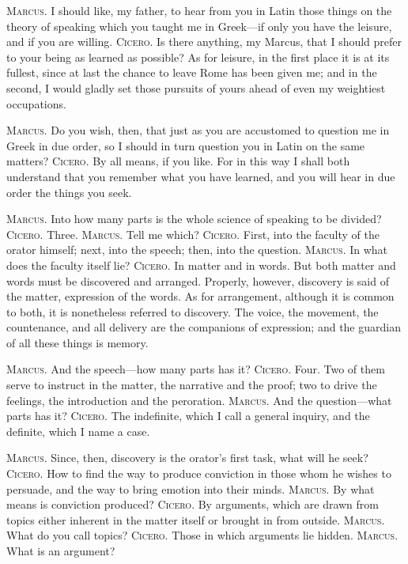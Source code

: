 
 \textsc{Marcus.} I should like, my father, to hear from you in Latin those things on the theory of speaking which you taught me in Greek—if only you have the leisure, and if you are willing. \textsc{Cicero.} Is there anything, my Marcus, that I should prefer to your being as learned as possible? As for leisure, in the first place it is at its fullest, since at last the chance to leave Rome has been given me; and in the second, I would gladly set those pursuits of yours ahead of even my weightiest occupations.

 \textsc{Marcus.} Do you wish, then, that just as you are accustomed to question me in Greek in due order, so I should in turn question you in Latin on the same matters? \textsc{Cicero.} By all means, if you like. For in this way I shall both understand that you remember what you have learned, and you will hear in due order the things you seek.

 \textsc{Marcus.} Into how many parts is the whole science of speaking to be divided? \textsc{Cicero.} Three. \textsc{Marcus.} Tell me which? \textsc{Cicero.} First, into the faculty of the orator himself; next, into the speech; then, into the question. \textsc{Marcus.} In what does the faculty itself lie? \textsc{Cicero.} In matter and in words. But both matter and words must be discovered and arranged. Properly, however, discovery is said of the matter, expression of the words. As for arrangement, although it is common to both, it is nonetheless referred to discovery. The voice, the movement, the countenance, and all delivery are the companions of expression; and the guardian of all these things is memory.

 \textsc{Marcus.} And the speech—how many parts has it? \textsc{Cicero.} Four. Two of them serve to instruct in the matter, the narrative and the proof; two to drive the feelings, the introduction and the peroration. \textsc{Marcus.} And the question—what parts has it? \textsc{Cicero.} The indefinite, which I call a general inquiry, and the definite, which I name a case.

 \textsc{Marcus.} Since, then, discovery is the orator's first task, what will he seek? \textsc{Cicero.} How to find the way to produce conviction in those whom he wishes to persuade, and the way to bring emotion into their minds. \textsc{Marcus.} By what means is conviction produced? \textsc{Cicero.} By arguments, which are drawn from topics either inherent in the matter itself or brought in from outside. \textsc{Marcus.} What do you call topics? \textsc{Cicero.} Those in which arguments lie hidden. \textsc{Marcus.} What is an argument?

